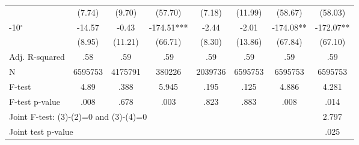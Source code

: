 \begin{table}[H]
\begin{tabular}{lccccccc}
 & (7.74) & (9.70) & (57.70) & (7.18) & (11.99) & (58.67) & (58.03) \\
-10$^\circ$ & -14.57 & -0.43 & -174.51*** & -2.44 & -2.01 & -174.08** & -172.07** \\
 & (8.95) & (11.21) & (66.71) & (8.30) & (13.86) & (67.84) & (67.10) \\
\hline
Adj. R-squared & .58 & .59 & .59 & .59 & .59 & .59 & .59 \\
N & 6595753 & 4175791 & 380226 & 2039736 & 6595753 & 6595753 & 6595753 \\
F-test & 4.89 & .388 & 5.945 & .195 & .125 & 4.886 & 4.281 \\
F-test p-value & .008 & .678 & .003 & .823 & .883 & .008 & .014 \\
\hline
\multicolumn{7}{l}{Joint F-test: (3)-(2)=0 and (3)-(4)=0} & 2.797 \\
\multicolumn{7}{l}{Joint test p-value} & .025 \\
\hline\hline
\end{tabular}
\end{table}
